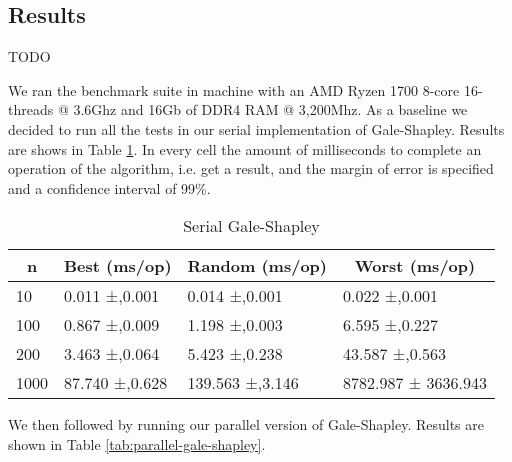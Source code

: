 \subsection{Results}

TODO

We ran the benchmark suite in machine with an AMD Ryzen 1700 8-core 16-threads @ 3.6Ghz and 16Gb of DDR4 RAM @ 3,200Mhz. As a baseline we decided to run all the tests in our serial implementation of Gale-Shapley. Results are shows in Table \ref{tab:serial-gale-shapley}. In every cell the amount of milliseconds to complete an operation of the algorithm, i.e. get a result, and the margin of error is specified and a confidence interval of 99\%. 

\begin{table}[!ht]
    \centering
\begin{tabular}{|l|l|l|l|}
\hline
\multicolumn{1}{|c|}{\textbf{n}} & \multicolumn{1}{c|}{\textbf{Best (ms/op)}} & \multicolumn{1}{c|}{\textbf{Random (ms/op)}} & \multicolumn{1}{c|}{\textbf{Worst (ms/op)}} \\ \hline
10                               & 0.011 ±,0.001                              & 0.014 ±,0.001                                & 0.022 ±,0.001                               \\ \hline
100                              & 0.867 ±,0.009                              & 1.198 ±,0.003                                & 6.595 ±,0.227                               \\ \hline
200                              & 3.463 ±,0.064                              & 5.423 ±,0.238                                & 43.587 ±,0.563                              \\ \hline
1000                             & 87.740 ±,0.628                             & 139.563 ±,3.146                              & 8782.987 ± 3636.943                         \\ \hline
\end{tabular}
    \caption{Serial Gale-Shapley}
    \label{tab:serial-gale-shapley}
\end{table}

We then followed by running our parallel version of Gale-Shapley. Results are shown in Table \ref{tab:parallel-gale-shapley}.


